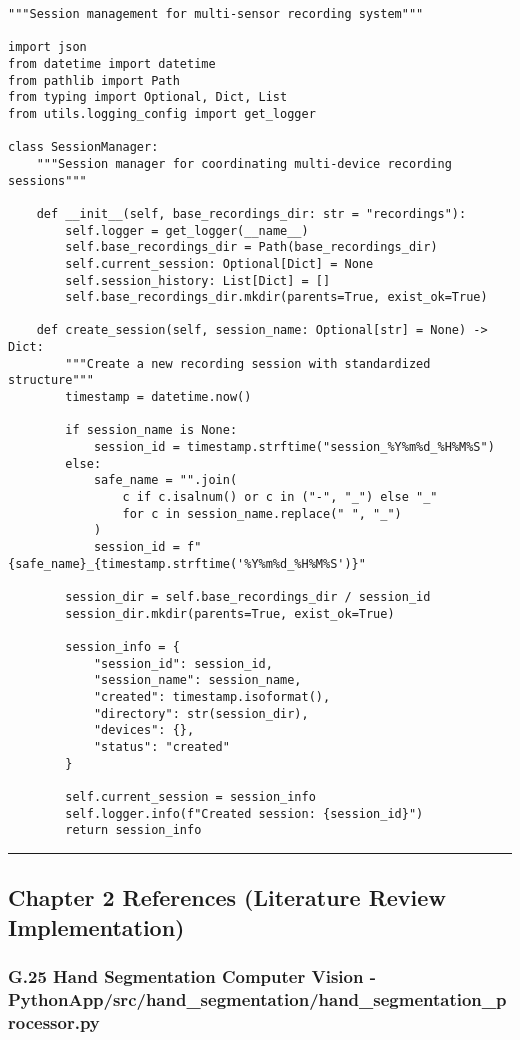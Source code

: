 \documentclass[12pt,a4paper]{article}
\begin{document}
\begin{verbatim}
"""Session management for multi-sensor recording system"""

import json
from datetime import datetime
from pathlib import Path
from typing import Optional, Dict, List
from utils.logging_config import get_logger

class SessionManager:
    """Session manager for coordinating multi-device recording sessions"""
    
    def __init__(self, base_recordings_dir: str = "recordings"):
        self.logger = get_logger(__name__)
        self.base_recordings_dir = Path(base_recordings_dir)
        self.current_session: Optional[Dict] = None
        self.session_history: List[Dict] = []
        self.base_recordings_dir.mkdir(parents=True, exist_ok=True)
    
    def create_session(self, session_name: Optional[str] = None) -> Dict:
        """Create a new recording session with standardized structure"""
        timestamp = datetime.now()
        
        if session_name is None:
            session_id = timestamp.strftime("session_%Y%m%d_%H%M%S")
        else:
            safe_name = "".join(
                c if c.isalnum() or c in ("-", "_") else "_" 
                for c in session_name.replace(" ", "_")
            )
            session_id = f"{safe_name}_{timestamp.strftime('%Y%m%d_%H%M%S')}"
        
        session_dir = self.base_recordings_dir / session_id
        session_dir.mkdir(parents=True, exist_ok=True)
        
        session_info = {
            "session_id": session_id,
            "session_name": session_name,
            "created": timestamp.isoformat(),
            "directory": str(session_dir),
            "devices": {},
            "status": "created"
        }
        
        self.current_session = session_info
        self.logger.info(f"Created session: {session_id}")
        return session_info
\end{verbatim}

\hrule

\subsection{Chapter 2 References (Literature Review Implementation)}

\subsubsection{G.25 Hand Segmentation Computer Vision - PythonApp/src/hand_segmentation/hand_segmentation_processor.py}
\end{document}
